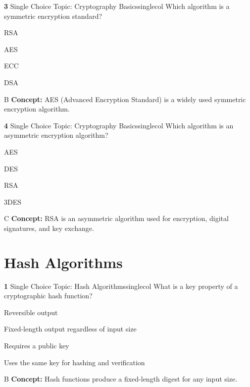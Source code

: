 \documentclass[10pt,a4paper]{article}
\begin{document}
\begin{qcard}{\color{white}\textbf{3} \hfill \small Single Choice \textbar{} Topic: Cryptography Basics}{singlecol}
Which algorithm is a symmetric encryption standard?

\begin{qoptions}
\item RSA
\item AES
\item ECC
\item DSA
\end{qoptions}
\begin{explainbox}{B}
\textbf{Concept:} AES (Advanced Encryption Standard) is a widely used symmetric encryption algorithm.
\end{explainbox}
\end{qcard}

\begin{qcard}{\color{white}\textbf{4} \hfill \small Single Choice \textbar{} Topic: Cryptography Basics}{singlecol}
Which algorithm is an asymmetric encryption algorithm?

\begin{qoptions}
\item AES
\item DES
\item RSA
\item 3DES
\end{qoptions}
\begin{explainbox}{C}
\textbf{Concept:} RSA is an asymmetric algorithm used for encryption, digital signatures, and key exchange.
\end{explainbox}
\end{qcard}

\section{Hash Algorithms}
\begin{qcard}{\color{white}\textbf{1} \hfill \small Single Choice \textbar{} Topic: Hash Algorithms}{singlecol}
What is a key property of a cryptographic hash function?

\begin{qoptions}
\item Reversible output
\item Fixed-length output regardless of input size
\item Requires a public key
\item Uses the same key for hashing and verification
\end{qoptions}
\begin{explainbox}{B}
\textbf{Concept:} Hash functions produce a fixed-length digest for any input size.
\end{explainbox}
\end{qcard}
\end{document}
